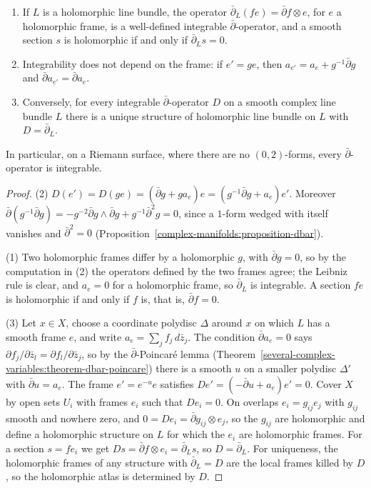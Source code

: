 \begin{proposition}\label{holomorphic-bundles:proposition-dbar-operator}
\begin{enumerate}
\item If $L$ is a holomorphic line bundle, the operator $\bar\partial_L(fe) = \bar\partial f \otimes e$, for $e$ a holomorphic frame, is a well-defined integrable $\bar\partial$-operator, and a smooth section $s$ is
holomorphic if and only if $\bar\partial_Ls = 0$.
\item Integrability does not depend on the frame: if $e' = ge$, then $a_{e'} = a_e + g^{-1}\bar\partial g$ and $\bar\partial a_{e'} = \bar\partial a_e$.
\item Conversely, for every integrable $\bar\partial$-operator $D$ on a smooth complex line bundle $L$ there is a unique structure of holomorphic line bundle on $L$ with $D = \bar\partial_L$.
\end{enumerate}
In particular, on a Riemann surface, where there are no $(0,2)$-forms, every $\bar\partial$-operator is integrable.
\end{proposition}

\begin{proof}
(2) $D(e') = D(ge) = (\bar\partial g + ga_e)e = (g^{-1}\bar\partial g + a_e)e'$. Moreover $\bar\partial(g^{-1}\bar\partial g) = -g^{-2}\bar\partial g \wedge \bar\partial g + g^{-1}\bar\partial^2g = 0$, since a $1$-form wedged with itself vanishes and $\bar\partial^2 = 0$
(Proposition~\ref{complex-manifolds:proposition-dbar}).

(1) Two holomorphic frames differ by a holomorphic $g$, with $\bar\partial g = 0$, so by the computation in (2) the operators defined by the two frames agree; the Leibniz rule is clear, and $a_e = 0$ for a holomorphic frame, so
$\bar\partial_L$ is integrable. A section $fe$ is holomorphic if and only if $f$ is, that is, $\bar\partial f = 0$.

(3) Let $x \in X$, choose a coordinate polydisc $\Delta$ around $x$ on which $L$ has a smooth frame $e$, and write $a_e = \sum_jf_j\,d\bar z_j$. The condition $\bar\partial a_e = 0$ says
$\partial f_j/\partial\bar z_l = \partial f_l/\partial\bar z_j$, so by the $\bar\partial$-Poincar\'e lemma (Theorem~\ref{several-complex-variables:theorem-dbar-poincare}) there is a smooth $u$ on a smaller polydisc $\Delta'$
with $\bar\partial u = a_e$. The frame $e' = e^{-u}e$ satisfies $De' = (-\bar\partial u + a_e)e' = 0$. Cover $X$ by open sets $U_i$ with frames $e_i$ such that $De_i = 0$. On overlaps $e_i = g_{ij}e_j$ with $g_{ij}$ smooth and
nowhere zero, and $0 = De_i = \bar\partial g_{ij} \otimes e_j$, so the $g_{ij}$ are holomorphic and define a holomorphic structure on $L$ for which the $e_i$ are holomorphic frames. For a section $s = fe_i$ we
get $Ds = \bar\partial f \otimes e_i = \bar\partial_Ls$, so $D = \bar\partial_L$. For uniqueness, the holomorphic frames of any structure with $\bar\partial_L = D$ are the local frames killed by $D$, so the holomorphic
atlas is determined by $D$.
\end{proof}

